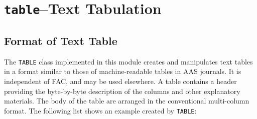 \documentclass[twoside,letterpaper]{refrep}
\newcommand{\key}[1]{\texttt{#1}}
\newcommand{\mod}[1]{\texttt{#1}}
\begin{document}
\section{\mod{table}--Text Tabulation}
\label{sec:table}
\subsection{Format of Text Table}
\label{subsec:format}
The \key{TABLE} class implemented in this module creates and manipulates
text tables in a format similar to those of machine-readable tables in AAS
journals. It is independent of FAC, and may be used elsewhere. A table
contains a header providing the byte-by-byte description of the columns and
other explanatory materials. The body of the table are arranged in the
conventional multi-column format. The following list shows an example created
by \key{TABLE}:
\end{document}
